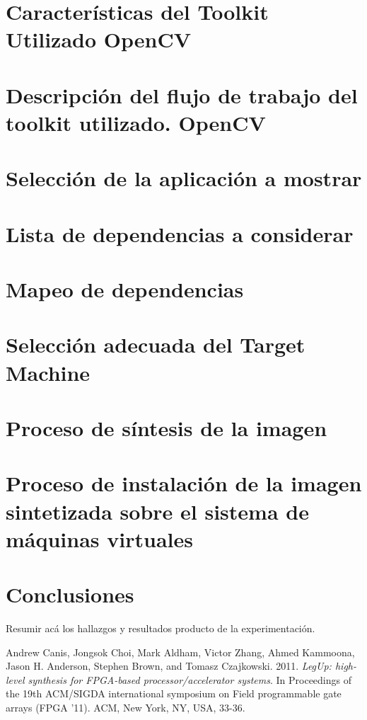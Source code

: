 \documentclass[12pt,letterpaper]{article}
\begin{document}
\section{Características del Toolkit Utilizado OpenCV}
\section{Descripción del flujo de trabajo del toolkit utilizado. OpenCV}
\section{Selección de la aplicación a mostrar}
\section{Lista de dependencias a considerar}
\section{Mapeo de dependencias}
\section{Selección adecuada del Target Machine}
\section{Proceso de síntesis de la imagen}
\section{Proceso de instalación de la imagen sintetizada sobre el sistema de máquinas virtuales}


\section{Conclusiones}
Resumir acá los hallazgos y resultados producto de la experimentación.


\begin{thebibliography}{99}

Andrew Canis, Jongsok Choi, Mark Aldham, Victor Zhang, Ahmed Kammoona, Jason H. 
Anderson, Stephen Brown, and Tomasz Czajkowski. 2011. \textit{LegUp: high-level 
synthesis for FPGA-based processor/accelerator systems}. In Proceedings of the 
19th ACM/SIGDA international symposium on Field programmable gate arrays (FPGA 
'11). ACM, New York, NY, USA, 33-36. 

\end{thebibliography}
\end{document}
